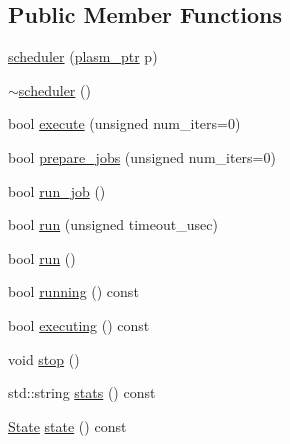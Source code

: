 \subsection*{Public Member Functions}
\begin{DoxyCompactItemize}
\item 
\hyperlink{classecto_1_1scheduler_a3a2999bde52bfacfc194243ef2ae4f89}{scheduler} (\hyperlink{namespaceecto_a6b83be6cd685db71f03b14871653475f}{plasm\+\_\+ptr} p)
\item 
\hyperlink{classecto_1_1scheduler_aac758e34705ebab32cf66bdf42f0d89d}{$\sim$scheduler} ()
\item 
bool \hyperlink{classecto_1_1scheduler_ad917e3fa322f0a065e306afec7284d4e}{execute} (unsigned num\+\_\+iters=0)
\item 
bool \hyperlink{classecto_1_1scheduler_a6f723a36600b0a47c9b387c460cf3d59}{prepare\+\_\+jobs} (unsigned num\+\_\+iters=0)
\item 
bool \hyperlink{classecto_1_1scheduler_a7fcfe7583c13ff5d2294242aedfa0b1a}{run\+\_\+job} ()
\item 
bool \hyperlink{classecto_1_1scheduler_a326022cba6c3154f28f9694b7c9968fd}{run} (unsigned timeout\+\_\+usec)
\item 
bool \hyperlink{classecto_1_1scheduler_a8d5ce4f97e511341f315bb7621ba38f4}{run} ()
\item 
bool \hyperlink{classecto_1_1scheduler_a99ac4b8df3d015f6a39d0cf7607cc657}{running} () const 
\item 
bool \hyperlink{classecto_1_1scheduler_a13257817e1cc6c1ce04ef0bfdabc5375}{executing} () const 
\item 
void \hyperlink{classecto_1_1scheduler_ab974783264da5c33a19110926b5565f4}{stop} ()
\item 
std\+::string \hyperlink{classecto_1_1scheduler_a99d2f51779f856b3905bb8b493f091c4}{stats} () const 
\item 
\hyperlink{classecto_1_1scheduler_a6b063d1c4bb9dad58d7ace61946b1200}{State} \hyperlink{classecto_1_1scheduler_a5497ae108416ccdf7d80fa7c8e462992}{state} () const 
\end{DoxyCompactItemize}

